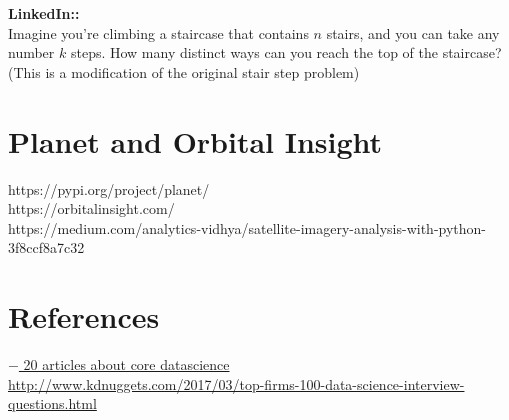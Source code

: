 \documentclass[11pt]{article}
\begin{document}
{\bf LinkedIn:: }\\
Imagine you’re climbing a staircase that contains $n$ stairs, and you can take any number $k$ steps. How many distinct ways can you reach the top of the staircase? (This is a modification of the original stair step problem) \\


\newpage
\section{Planet and Orbital Insight}
https://pypi.org/project/planet/\\
https://orbitalinsight.com/ \\
https://medium.com/analytics-vidhya/satellite-imagery-analysis-with-python-3f8ccf8a7c32


\newpage
\section{References}
\href{http://www.datasciencecentral.com/profiles/blogs/20-articles-about-core-data-science}{$-$ 20 articles about core datascience}\\
\href{http://www.kdnuggets.com/2017/03/top-firms-100-data-science-interview-questions.html}{http://www.kdnuggets.com/2017/03/top-firms-100-data-science-interview-questions.html}
\end{document}
